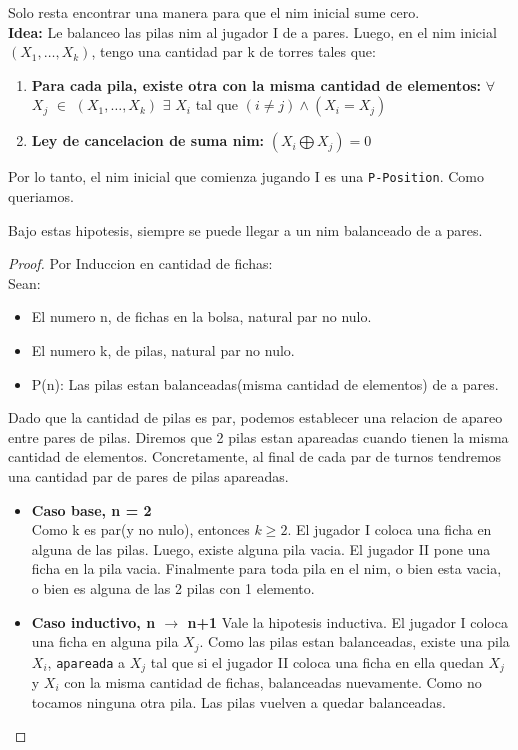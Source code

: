 Solo resta encontrar una manera para que el nim inicial sume cero.\\

\textbf{Idea:} Le balanceo las pilas nim al jugador I de a pares. Luego, en el nim inicial $(X_1, \dots, X_k)$, tengo una cantidad par k de torres tales que:\\
\begin{enumerate}
	\item \textbf{Para cada pila, existe otra con la misma cantidad de elementos:} $\forall $ $ X_j $ $ \in $ $(X_1, \dots, X_k)$ $\exists$ $ X_i $ tal que $ (i \neq j) \land (X_i = X_j) $  
	\item \textbf{Ley de cancelacion de suma nim:} $ (X_i \bigoplus X_j) = 0$  
\end{enumerate}

Por lo tanto, el nim inicial que comienza jugando I es una \texttt{P-Position}. Como queriamos.

\begin{theorem}
	Bajo estas hipotesis, siempre se puede llegar a un nim balanceado de a pares.
\end{theorem}

\begin{proof}
Por Induccion en cantidad de fichas:\\

Sean:
\begin{itemize}
	\item El numero n, de fichas en la bolsa, natural par no nulo.
	\item El numero k, de pilas, natural par no nulo.
	\item P(n): {Las pilas estan balanceadas(misma cantidad de elementos) de a pares}.
\end{itemize}

Dado que la cantidad de pilas es par, podemos establecer una relacion de apareo entre pares de pilas. Diremos que 2 pilas estan apareadas cuando tienen la misma cantidad de elementos. Concretamente, al final de cada par de turnos tendremos una cantidad par de pares de pilas apareadas.

\begin{itemize}
	\item \textbf{Caso base, n = 2}\\
	Como k es par(y no nulo), entonces $k \geq 2 $. El jugador I coloca una ficha en alguna de las pilas. Luego, existe alguna pila vacia. El jugador II pone una ficha en la pila vacia. Finalmente para toda pila en el nim, o bien esta vacia, o bien es alguna de las 2 pilas con 1 elemento.

	\item \textbf{Caso inductivo, n $\rightarrow$ n+1}
	Vale la hipotesis inductiva. El jugador I coloca una ficha en alguna pila $X_j$. Como las pilas estan balanceadas, existe una pila $X_i$, \texttt{apareada} a $X_j$ tal que si el jugador II coloca una ficha en ella quedan $X_j$ y $X_i$ con la misma cantidad de fichas, balanceadas nuevamente. Como no tocamos ninguna otra pila. Las pilas vuelven a quedar balanceadas.

\end{itemize}
\end{proof}

